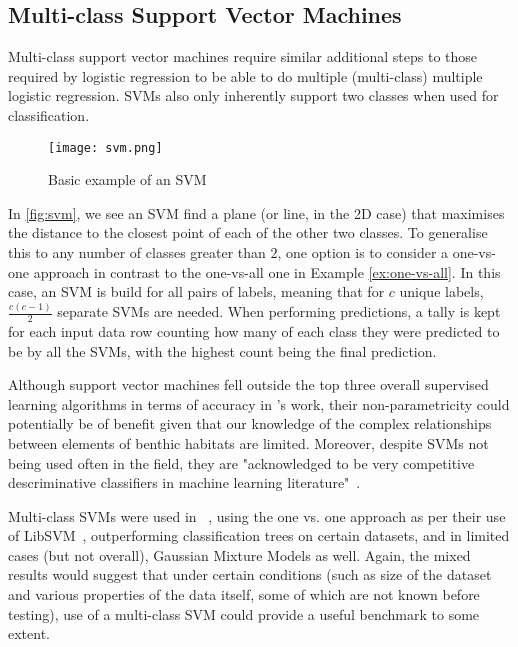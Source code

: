 \subsection{Multi-class Support Vector Machines}

Multi-class support vector machines require similar additional steps to those required by logistic regression to be able to do multiple (multi-class) multiple logistic regression. SVMs also only inherently support two classes when used for classification.

\begin{figure}
    \texttt{[image: svm.png]}
    \caption{Basic example of an SVM}
    \label{fig:svm}
\end{figure}

In \autoref{fig:svm}, we see an SVM find a plane (or line, in the 2D case) that maximises the distance to the closest point of each of the other two classes. To generalise this to any number of classes greater than $2$, one option is to consider a one-vs-one approach in contrast to the one-vs-all one in Example \autoref{ex:one-vs-all}. In this case, an SVM is build for all pairs of labels, meaning that for $c$ unique labels, $\frac{c(c-1)}{2}$ separate SVMs are needed. When performing predictions, a tally is kept for each input data row counting how many of each class they were predicted to be by all the SVMs, with the highest count being the final prediction.

Although support vector machines fell outside the top three overall supervised learning algorithms in terms of accuracy in \citet{caruana06}'s work, their non-parametricity could potentially be of benefit given that our knowledge of the complex relationships between elements of benthic habitats are limited. Moreover, despite SVMs not being used often in the field, they are "acknowledged to be very competitive descriminative classifiers in machine learning literature"~\citep{ahsan11}. 

Multi-class SVMs were used in ~\citet{ahsan11}, using the one vs. one approach as per their use of LibSVM~\citep{chang11}, outperforming classification trees on certain datasets, and in limited cases (but not overall), Gaussian Mixture Models as well. Again, the mixed results would suggest that under certain conditions (such as size of the dataset and various properties of the data itself, some of which are not known before testing), use of a multi-class SVM could provide a useful benchmark to some extent.

